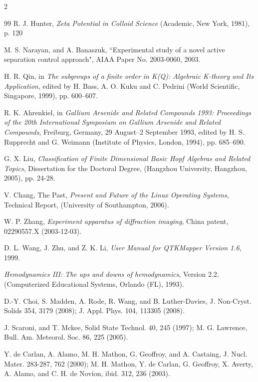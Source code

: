 \documentclass[fleqn]{2026SCGE}
\begin{document}
\begin{multicols}{2}
\begin{thebibliography}{99}
 R. J. Hunter, \textit{Zeta Potential in Colloid Science} (Academic, New York, 1981), p. 120 %

 M. S. Narayan, and A. Banaszuk, ``Experimental study of a novel active separation control approach", AIAA Paper No. 2003-0060, 2003. %

 H. R. Qin, in \textit{The subgroups of a finite order in K(Q): Algebraic K-theory and Its Application}, edited by H. Bass, A. O. Kuku and C. Pedrini (World Scientific, Singapore, 1999), pp. 600–607. %

 	R. K. Ahrenkiel, in \textit{Gallium Arsenide and Related Compounds 1993: Proceedings of the 20th International Symposium on Gallium Arsenide and Related Compounds}, Freiburg, Germany, 29 August–2 September 1993, edited by H. S. Rupprecht and G. Weimann (Institute of Physics, London, 1994), pp. 685–690. %

 G. X. Liu, \textit{Classification of Finite Dimensional Basic Hopf Algebras and Related Topics}, Dissertation for the Doctoral Degree, (Hangzhou University, Hangzhou, 2005), pp. 24-28. %

  V. Chang, The Past, \textit{Present and Future of the Linux Operating Systems}, Technical Report, (University of Southampton, 2006).%

  W. P. Zhang, \textit{Experiment apparatus of diffraction imaging}, China patent, 02290557.X (2003-12-03). %

  D. L. Wang, J. Zhu, and Z. K. Li, \textit{User Manual for QTKMapper Version 1.6}, 1999. %

 \textit{Hemodynamics III: The ups and downs of hemodynamics}, Version 2.2, (Computerized Educational Systems, Orlando (FL), 1993). %

 D.-Y. Choi, S. Madden, A. Rode, R. Wang, and B. Luther-Davies, J. Non-Cryst. Solids 354, 3179 (2008); J. Appl. Phys. 104, 113305 (2008). %

 J. Scaroni, and T. Mckee, Solid State Technol. 40, 245 (1997); M. G. Lawrence, Bull. Am. Meteorol. Soc. 86, 225 (2005). %

 Y. de Carlan, A. Alamo, M. H. Mathon, G. Geoffroy, and A. Castaing, J. Nucl. Mater. 283-287, 762 (2000); M. H. Mathon, Y. de Carlan, G. Geoffroy, X. Averty, A. Alamo, and C. H. de Novion, ibid. 312, 236 (2003).




\end{thebibliography}
\end{multicols}
\end{document}
